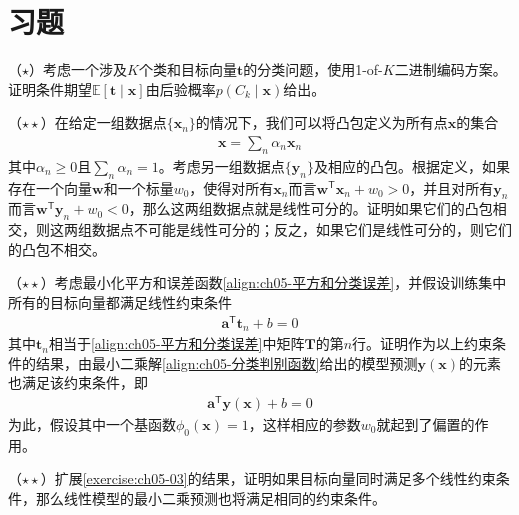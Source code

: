 \documentclass[../../main.tex]{subfiles}
\begin{document}
\section{习题}\label{section:ch05-习题}

\begin{exercise}\label{exercise:ch05-01}
（$\star$）考虑一个涉及$K$个类和目标向量$\boldsymbol{t}$的分类问题，使用1-of-$K$二进制编码方案。证明条件期望$\mathbb{E}[\boldsymbol{t}\mid\boldsymbol{x}]$由后验概率$p(C_k\mid\boldsymbol{x})$给出。
\end{exercise}

\begin{exercise}\label{exercise:ch05-02}
（$\star\star$）在给定一组数据点$\{\boldsymbol{x}_n\}$的情况下，我们可以将凸包定义为所有点$\boldsymbol{x}$的集合
\begin{align}
  \boldsymbol{x}=\sum_{n}\alpha_n\boldsymbol{x}_n
  \label{align:ch05-凸包}
\end{align}
其中$\alpha_n\geqslant 0$且$\sum_n\alpha_n=1$。考虑另一组数据点$\{\boldsymbol{y}_n\}$及相应的凸包。根据定义，如果存在一个向量$\boldsymbol{w}$和一个标量$w_0$，使得对所有$\boldsymbol{x}_n$而言$\boldsymbol{w}^{\mathsf{T}}\boldsymbol{x}_n+w_0>0$，并且对所有$\boldsymbol{y}_n$而言$\boldsymbol{w}^{\mathsf{T}}\boldsymbol{y}_n+w_0<0$，那么这两组数据点就是线性可分的。证明如果它们的凸包相交，则这两组数据点不可能是线性可分的；反之，如果它们是线性可分的，则它们的凸包不相交。
\end{exercise}

\begin{exercise}\label{exercise:ch05-03}
（$\star\star$）考虑最小化平方和误差函数\eqref{align:ch05-平方和分类误差}，并假设训练集中所有的目标向量都满足线性约束条件
\begin{align}
  \boldsymbol{a}^{\mathsf{T}}\boldsymbol{t}_n+b=0
  \label{align:ch05-习题约束}
\end{align}
其中$\boldsymbol{t}_n$相当于\eqref{align:ch05-平方和分类误差}中矩阵$\boldsymbol{T}$的第$n$行。证明作为以上约束条件的结果，由最小二乘解\eqref{align:ch05-分类判别函数}给出的模型预测$\boldsymbol{y}(\boldsymbol{x})$的元素也满足该约束条件，即
\begin{align}
  \boldsymbol{a}^{\mathsf{T}}\boldsymbol{y}(\boldsymbol{x})+b=0
  \label{align:ch05-习题预测约束}
\end{align}
为此，假设其中一个基函数$\phi_0(\boldsymbol{x})=1$，这样相应的参数$w_0$就起到了偏置的作用。
\end{exercise}

\begin{exercise}\label{exercise:ch05-04}
（$\star\star$）扩展\cref{exercise:ch05-03}的结果，证明如果目标向量同时满足多个线性约束条件，那么线性模型的最小二乘预测也将满足相同的约束条件。
\end{exercise}
\end{document}
